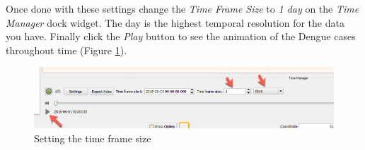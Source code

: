 \documentclass[a4paper,12pt,titlepage]{article}
\begin{document}
Once done with these settings change the \textit{Time Frame Size} to \textit{1 day} on the \textit{Time Manager} dock widget. The day is the highest temporal resolution for the data you have. Finally click the \textit{Play} button to see the animation of the Dengue cases throughout time (Figure \ref{fig:time_manager4}).
	
\begin{figure}[H]
	\centering
	\includegraphics[width=12cm]{Images/time_manager4.png}
	\caption{Setting the time frame size}\label{fig:time_manager4}
\end{figure}	
\end{document}
